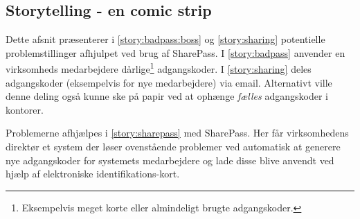 \subsection{Storytelling - en comic strip}
Dette afsnit præsenterer i \cref{story:badpass:boss} og \cref{story:sharing} potentielle problemstillinger afhjulpet ved brug af SharePass.
I \cref{story:badpass} anvender en virksomheds medarbejdere dårlige\footnote{Eksempelvis meget korte eller almindeligt brugte adgangskoder.} adgangskoder.
I \cref{story:sharing} deles adgangskoder (eksempelvis for nye medarbejdere) via email.
Alternativt ville denne deling også kunne ske på papir ved at ophænge \emph{fælles} adgangskoder i kontorer.

Problemerne afhjælpes i \cref{story:sharepass} med SharePass.
Her får virksomhedens direktør et system der løser ovenstående problemer ved automatisk at generere nye adgangskoder for systemets medarbejdere og lade disse blive anvendt ved hjælp af elektroniske identifikations-kort.

